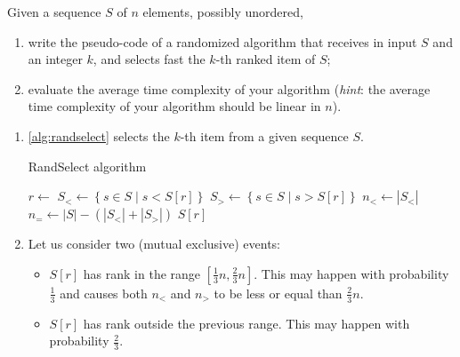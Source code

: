 \exercise

Given a sequence $S$ of $n$ elements, possibly unordered,
%
\begin{enumerate}

  \item write the pseudo-code of a randomized algorithm that receives in input
  $S$ and an integer $k$, and selects fast the $k$-th ranked item of $S$;

  \item evaluate the average time complexity of your algorithm (\emph{hint}: the
  average time complexity of your algorithm should be linear in $n$).

\end{enumerate}

\solution

\begin{enumerate}

  \item \autoref{alg:randselect} selects the $k$-th item from a given sequence
  $S$.
  \begin{algorithm}[t]
  \caption{RandSelect algorithm}\label{alg:randselect}
  \begin{algorithmic}[1]
    \State $r \gets $ 
    \State $S_< \gets \left\{ s \in S \mid s < S[r] \right\}$
    \State $S_> \gets \left\{ s \in S \mid s > S[r] \right\}$
    \State $n_< \gets |S_<|$
    \State $n_= \gets |S| - (|S_<| + |S_>|)$
      \State \Return {}
      \State \Return $S[r]$
    \Else
      \State \Return {}
    \EndIf
  \EndFunction
  \end{algorithmic}
  \end{algorithm}

  \item Let us consider two (mutual exclusive) events:
  \begin{itemize}

    \item $S[r]$ has rank in the range $\left[\frac{1}{3}n,
    \frac{2}{3}n\right]$. This may happen with probability $\frac{1}{3}$ and
    causes both $n_<$ and $n_>$ to be less or equal than $\frac{2}{3}n$.

    \item $S[r]$ has rank outside the previous range. This may happen with
    probability $\frac{2}{3}$.


\end{itemize}
\end{enumerate}
